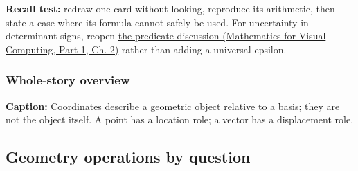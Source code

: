 \textbf{Recall test:} redraw one card without looking, reproduce its arithmetic, then state a case where its formula cannot safely be used. For uncertainty in determinant signs, reopen \href{../02-Mathematics-for-Visual-Computing-P01/main.pdf\#01-foundations-i-ch018-a-predicate-needs-a-trustworthy-sign}{the predicate discussion (Mathematics for Visual Computing, Part 1, Ch. 2)} rather than adding a universal epsilon.

\subsubsection{Whole-story overview}\label{appendix-38d9c8aca357-whole-story-overview}

\hypertarget{appendix-38d9c8aca357-whole-story-overview}{}


\textbf{Caption:} Coordinates describe a geometric object relative to a basis; they are not the object itself. A point has a location role; a vector has a displacement role.

\subsection{Geometry operations by question}\label{appendix-38d9c8aca357-geometry-operations-by-question}

\hypertarget{appendix-38d9c8aca357-geometry-operations-by-question}{}

